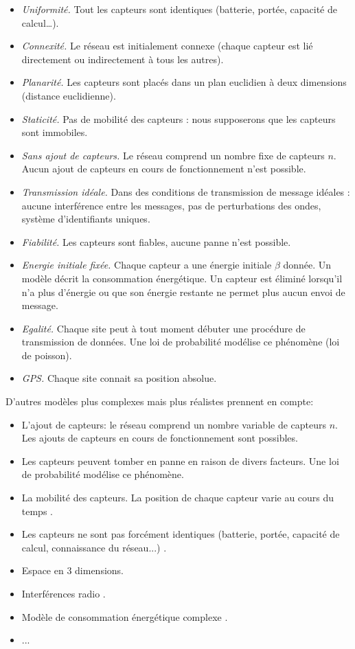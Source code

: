 \begin{itemize}
 \item \textit{Uniformité.} Tout les capteurs sont identiques (batterie, portée, capacité de calcul…).
 \item \textit{Connexité.} Le réseau est initialement connexe (chaque capteur est lié directement ou indirectement à tous les autres).
 \item \textit{Planarité.} Les capteurs sont placés dans un plan euclidien à deux dimensions (distance euclidienne).
 \item \textit{Staticité.} Pas de mobilité des capteurs : nous supposerons que les capteurs sont immobiles.
 \item \textit{Sans ajout de capteurs.} Le réseau comprend un nombre fixe de capteurs $n$. Aucun ajout de capteurs en cours de fonctionnement n'est possible.
 \item \textit{Transmission idéale.} Dans des conditions de transmission de message idéales : aucune interférence entre les messages, pas de perturbations des ondes, système d'identifiants uniques.
 \item \textit{Fiabilité.} Les capteurs sont fiables, aucune panne n'est possible.
 \item \textit{Energie initiale fixée.} Chaque capteur a une énergie initiale $\beta$ donnée. Un modèle décrit la consommation énergétique. Un capteur est éliminé lorsqu'il n'a plus d'énergie ou que son énergie 
 restante ne permet plus aucun envoi de message. 
 \item \textit{Egalité.} Chaque site peut à tout moment débuter une procédure de transmission de données. Une loi de probabilité modélise ce phénomène (loi de poisson).
 \item \textit{GPS.} Chaque site connait sa position absolue.  \\
\end{itemize}

D'autres modèles plus complexes mais plus réalistes prennent en compte:
  
\begin{itemize}
   
 \item L'ajout de capteurs: le réseau comprend un nombre variable de capteurs $n$. Les ajouts de capteurs en cours de fonctionnement sont possibles.
 \item Les capteurs peuvent tomber en panne en raison de divers facteurs. Une loi de probabilité modélise ce phénomène.   
 \item La mobilité des capteurs. La position de chaque capteur varie au cours du temps \cite{Giordano2003}.
 \item Les capteurs ne sont pas forcément identiques (batterie, portée, capacité de calcul, connaissance du réseau...) \cite{Akyildiz2002}.
 \item Espace en 3 dimensions.
 \item Interférences radio \cite{Agarwal2005}.
 \item Modèle de consommation énergétique complexe \cite{Deng2005}.
 \item ...
\end{itemize}


